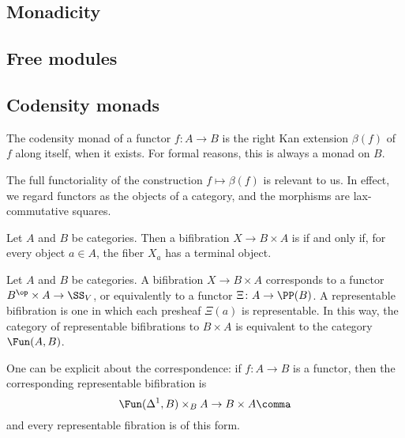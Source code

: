 \subsection{Monadicity}%
\label{monadicity}

\subsection{Free modules}%
\label{sub:free_modules}

\subsection{Codensity monads}%
\label{sub:codensity_monads}

The codensity monad of a functor $ f \colon A \to B $
is the right Kan extension $ \beta(f) $ of $ f $ along itself,
when it exists.
For formal reasons, this is always a monad on $ B $.

The full functoriality
of the construction $ f \mapsto \beta(f) $
is relevant to us.
In effect, we regard functors as the objects of a category,
and the morphisms are lax-commutative squares.


\begin{definition}
	Let $ A $ and $ B $ be categories.
	Then a bifibration 
	\citep[\S\S 2.4.7]{Lurie2009}
	$ X \to B \times A $ is 
	if and only if,
	for every object $ a \in A $,
	the fiber $ X_a $ has a terminal object.
\end{definition}

\begin{nul}
	Let $ A $ and $ B $ be categories.
	A bifibration $ X \to B \times A $ corresponds
	to a functor $ B^{\op} \times A \to \SS_V $,
	or equivalently to a functor $ \Xi \colon A \to \PP(B) $.
	A representable bifibration is one in which
	each presheaf $ \Xi(a) $ is representable.
	In this way,
	the category of representable bifibrations to $ B \times A $
	is equivalent to the category $ \Fun(A, B) $.

	One can be explicit about the correspondence:
	if $ f \colon A \to B $ is a functor,
	then the corresponding representable bifibration is
	\[
		\Fun(\Delta^1, B) \times_B A \to B \times A \comma
	\]
	and every representable fibration is of this form.
\end{nul}

